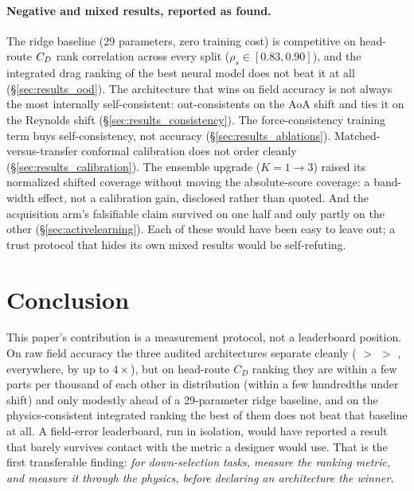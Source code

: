 \paragraph{Negative and mixed results, reported as found.} The ridge baseline
(29 parameters, zero training cost) is competitive on head-route $C_D$ rank
correlation across every split ($\rho_s\in[0.83,0.90]$), and the integrated
drag ranking of the best neural model does not beat it at all
(\S\ref{sec:results_ood}). The architecture that wins on field accuracy is not
always the most internally self-consistent: \Mfno{} out-consistents \Mtrans{}
on the AoA shift and ties it on the Reynolds shift
(\S\ref{sec:results_consistency}). The
force-consistency training term buys self-consistency, not accuracy
(\S\ref{sec:results_ablations}). Matched-versus-transfer conformal
calibration does not order cleanly (\S\ref{sec:results_calibration}). The
\Mgnn{} ensemble upgrade ($K=1\to3$) raised its normalized shifted coverage
without moving the absolute-score coverage: a band-width effect, not a
calibration gain, disclosed rather than quoted. And the acquisition arm's
falsifiable claim survived on one half and only partly on the other
(\S\ref{sec:activelearning}). Each of these would have been easy to leave
out; a trust protocol that hides its own mixed results would be
self-refuting.

\section{Conclusion}
\label{sec:conclusion}

This paper's contribution is a measurement protocol, not a leaderboard
position. On raw field accuracy the three audited architectures separate
cleanly (\Mtrans{} $>$ \Mfno{} $>$ \Mgnn, everywhere, by up to $4\times$),
but on head-route $C_D$ ranking they are within a few parts per thousand of
each other in distribution (within a few hundredths under shift) and only
modestly ahead of a 29-parameter ridge baseline, and on
the physics-consistent integrated ranking the best of them does not beat that
baseline at all. A field-error leaderboard, run in isolation, would have
reported a result that barely survives contact with the metric a designer
would use. That is the first transferable finding: \emph{for down-selection
tasks, measure the ranking metric, and measure it through the physics, before
declaring an architecture the winner.}

